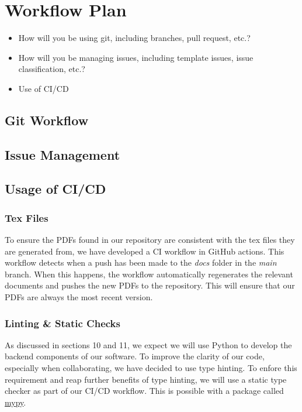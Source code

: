 \documentclass{article}
\begin{document}
\section{Workflow Plan}

\begin{itemize}
	\item How will you be using git, including branches, pull request, etc.?
	\item How will you be managing issues, including template issues, issue
	classification, etc.?
  \item Use of CI/CD
\end{itemize}

\subsection{Git Workflow}

\subsection{Issue Management}

\subsection{Usage of CI/CD}

\subsubsection{Tex Files}
To ensure the PDFs found in our repository are consistent with the tex files they are generated from, we have developed a CI workflow in GitHub actions.
 This workflow detects when a push has been made to the \textit{docs} folder in the \textit{main} branch. When this happens, the workflow automatically regenerates
 the relevant documents and pushes the new PDFs to the repository. This will ensure that our PDFs are always the most recent version.

\subsubsection{Linting \& Static Checks}
As discussed in sections 10 and 11, we expect we will use Python to develop the backend components of our software. To improve the clarity of our code, especially
when collaborating, we have decided to use type hinting. To enfore this requirement and reap further benefits of type hinting, we will use a static
type checker as part of our CI/CD workflow. This is possible with a package called 
 \href{https://mypy-lang.org/}{mypy}.\\\\
\end{document}
